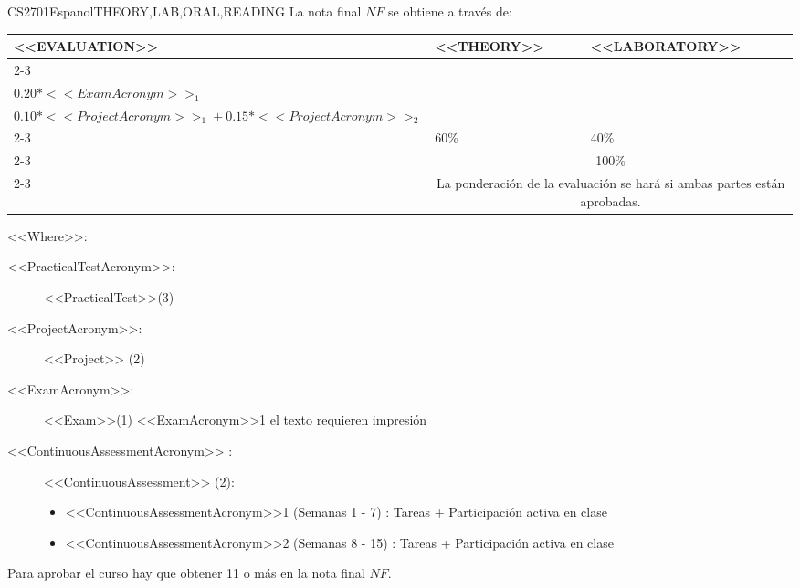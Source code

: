   \begin{evaluation}{CS2701}{Espanol}{THEORY,LAB,ORAL,READING}
  La nota final $NF$ se obtiene a través de:

  \begin{tabularx}{0.9\textwidth}{|X|p{}|p{}|} \hline
  \multirow{4}{*}{\uppercase{<<Evaluation>>}} & \uppercase{<<Theory>>} & \uppercase{<<Laboratory>>} \\ \cline{2-3}
  & %
      \begin{minipage}{0.95\textwidth}
      \begin{tabular}{l}
          $0.12*<<PracticalTestAcronym>>_{1} + 0.14*<<PracticalTestAcronym>>_{2} + 0.14*<<PracticalTestAcronym>>_{3}$ + \\  
          $0.20*<<ExamAcronym>>_{1}$
      \end{tabular} 
      \end{minipage} 
  & %
      \begin{minipage}{0.95\textwidth}
      \begin{tabular}{l}
          $0.07*<<ContinuousAssessmentAcronym>>_{1} + 0.08*<<ContinuousAssessmentAcronym>>_{2}$  +\\
          $0.10*<<ProjectAcronym>>_{1} + 0.15*<<ProjectAcronym>>_{2}$
          \end{tabular} 
      \end{minipage}                 \\ \cline{2-3}
  
  & %
  60\% 
  & %
  40\% \\ \cline{2-3}
  & \multicolumn{2}{|c|}{100\%}  \\ \cline{2-3}
  & \multicolumn{2}{|c|}{La ponderación de la evaluación se hará si ambas partes están aprobadas.}  \\ \hline
  \end{tabularx}
  
  \vspace{2mm}
  \noindent <<Where>>:
  \begin{description}
    \item[<<PracticalTestAcronym>>:] <<PracticalTest>>(3)
    \item[<<ProjectAcronym>>:] <<Project>> (2)   
    \item[<<ExamAcronym>>:] <<Exam>>(1) <<ExamAcronym>>1 el texto requieren impresión
    \item[<<ContinuousAssessmentAcronym>> :] <<ContinuousAssessment>> (2):
        \begin{itemize}
             \item  <<ContinuousAssessmentAcronym>>1 (Semanas 1 - 7) : Tareas + Participación activa en clase
              \item <<ContinuousAssessmentAcronym>>2 (Semanas 8 - 15) : Tareas + Participación activa en clase
        \end{itemize}
  \end{description}
  
  \noindent Para aprobar el curso hay que obtener 11 o más en la nota final $NF$.
  \end{evaluation}


